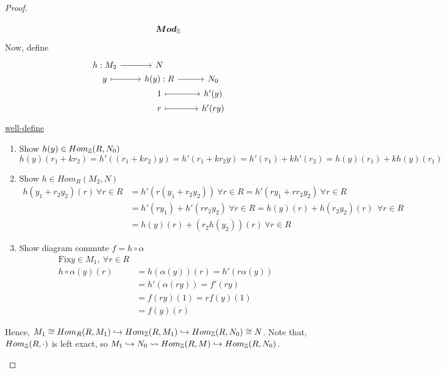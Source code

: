 \begin{theorem}
\begin{proof}
\begin{itemize}
$$\begin{tikzcd}[contains/.style = {draw=none, 
          "\in" description ,sloped}]
                      & \boldsymbol{Mod}_\Zb
        \end{tikzcd}
        $$
        Now, define
        $$
        \begin{tikzcd}[row sep=0.1]
          h: M_2 \ar[r] & N \\
          y \ar[r, mapsto] & h(y) : R \ar[r] & N_0 \\ 
                           & 1 \ar[r, mapsto] & h'(y) \\
                           & r \ar[r, mapsto] & h'(ry) \\
        \end{tikzcd}
        $$
        \underline{well-define}
        \begin{enumerate}
          \item Show $h(y) \in Hom_{\mathbb{Z}}(R, N_0)$
            $$
              h(y)(r_1 + k r_2) = h'((r_1 + k r_2) y) = h'(r_1 + k r_2y) 
              = h'(r_1) + k h'(r_2) = h(y)(r_1) + k h(y)(r_1)
            $$
          \item Show $h \in Hom_R(M_2, N)$
            $$
              \begin{aligned}
                h(y_1 + r_2y_2)(r) \ \forall r \in R &= h'(r (y_1 + 
                r_2y_2)) \ \forall r \in R 
                = h'(ry_1 + rr_2y_2) \ \forall r \in R \\
                &= h'(ry_1) + h'(rr_2y_2) \ \forall r \in R 
                = h(y)(r) + h(r_2y_2)(r) \ \ \forall r \in R \\
                &= h(y)(r) + (r_2h(y_2))(r) \ \forall r \in R
              \end{aligned}
            $$
          \item Show diagram commute $f = h \circ \alpha$
            $$
              \begin{aligned}
                \text{Fix} y \in M_1,\ \forall r \in R \\
                h \circ \alpha (y)(r) &= h(\alpha(y))(r)  = h'(r\alpha(y))\\
                                      &= h'(\alpha(ry)) = f'(ry) \\
                                      &= f(ry)(1) = rf(y)(1) \\
                                      &= f(y)(r)
              \end{aligned}
            $$
        \end{enumerate}
        Hence, $M_1 \cong Hom_R(R,M_1) \hookrightarrow Hom_{\mathbb{Z}}(R, M_1) \hookrightarrow 
        Hom_{\mathbb{Z}}(R,N_0) \cong N$. Note that, $Hom_{\mathbb{Z}}(R,\cdot)$ is left
        exact, so $M_1 \hookrightarrow N_0 \leadsto Hom_{\mathbb{Z}}(R, M) \hookrightarrow 
        Hom_{\mathbb{Z}}(R, N_0)$.
  \end{itemize}
 \end{proof}
\end{theorem}

